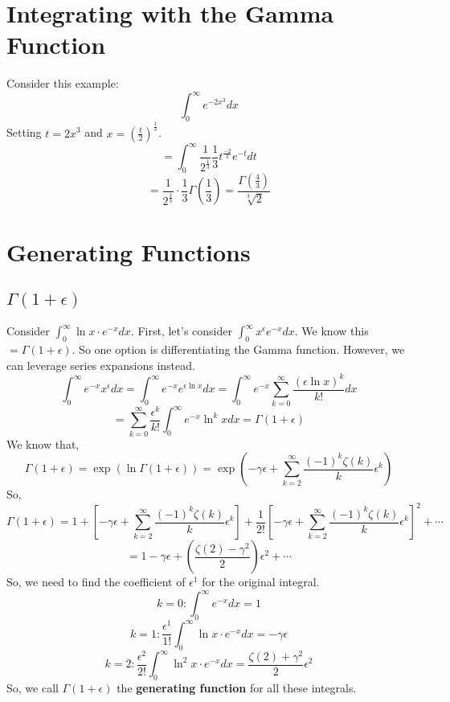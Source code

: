 \documentclass[../main.tex]{subfiles}
\begin{document}
\section{Integrating with the Gamma Function}
    Consider this example: $$\int_{0}^{\infty}e^{-2x^{3}}dx$$
    Setting $t=2x^{3}$ and $x=(\frac{t}{2})^{\frac{1}{3}}$.
    $$=\int_{0}^{\infty}\frac{1}{2^{\frac{1}{3}}}\frac{1}{3}t^{\frac{-2}{3}}e^{-t}dt$$
    $$=\frac{1}{2^{\frac{1}{3}}}\cdot\frac{1}{3}\Gamma(\frac{1}{3})=\frac{\Gamma\left(\frac{4}{3}\right)}{\sqrt[3]{2}}$$

\section{Generating Functions}
    \subsection{$\Gamma(1+\epsilon)$}
        Consider $\int_{0}^{\infty}\ln x \cdot e^{-x}dx$.
        First, let's consider $\int_{0}^{\infty}x^{\epsilon}e^{-x}dx$. We know this $=\Gamma(1+\epsilon)$. So one option is differentiating the Gamma function. However, 
        we can leverage series expansions instead.
        $$\int_{0}^{\infty}e^{-x}x^{\epsilon}dx=\int_{0}^{\infty}e^{-x}e^{\epsilon\ln x}dx=\int_{0}^{\infty}e^{-x}\sum_{k=0}^{\infty}\frac{(\epsilon\ln x)^{k}}{k!}dx$$
        $$=\sum_{k=0}^{\infty}\frac{\epsilon^{k}}{k!}\int_{0}^{\infty}e^{-x}\ln^{k}xdx=\Gamma(1+\epsilon)$$
        We know that,
        $$\Gamma(1+\epsilon)=\exp(\ln\Gamma(1+\epsilon))=\exp\left(-\gamma\epsilon+\sum_{k=2}^{\infty}\frac{(-1)^k\zeta(k)}{k}\epsilon^{k}\right)$$
        So,
        $$\Gamma(1+\epsilon)=1+\left[-\gamma\epsilon+\sum_{k=2}^{\infty}\frac{(-1)^{k}\zeta(k)}{k}\epsilon^{k}\right]+\frac{1}{2!}\left[-\gamma\epsilon + \sum_{k=2}^{\infty}\frac{(-1)^{k}\zeta(k)}{k}\epsilon^{k}\right]^{2}+\cdots$$
        $$=1-\gamma\epsilon+(\frac{\zeta(2)-\gamma^{2}}{2})\epsilon^{2}+\cdots$$
        So, we need to find the coefficient of $\epsilon^{1}$ for the original integral. 
        $$k=0:\int_{0}^{\infty}e^{-x}dx=1$$
        $$k=1:\frac{\epsilon^{1}}{1!}\int_{0}^{\infty}\ln x\cdot e^{-x}dx=-\gamma\epsilon$$
        $$k=2:\frac{\epsilon^{2}}{2!}\int_{0}^{\infty}\ln^{2} x\cdot e^{-x}dx=\frac{\zeta(2)+\gamma^{2}}{2}\epsilon^{2}$$
        So, we call $\Gamma(1+\epsilon)$ the \textbf{generating function} for all these integrals.
\end{document}
